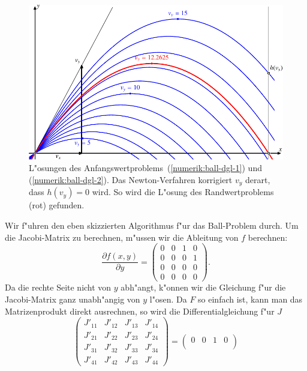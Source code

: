 \begin{beispiel}
\begin{figure}
\centering
\includegraphics{chapters/images/randwert-1.pdf}
\caption{L"osungen des Anfangswertproblems~(\ref{numerik:ball-dgl-1}) und
(\ref{numerik:ball-dgl-2}).
Das Newton-Verfahren korrigiert $v_y$ derart, dass $h(v_y)=0$ wird.
So wird die L"osung des Randwertproblems (rot) gefunden.
\label{numerik:randwert-bild}}
\end{figure}
Wir f"uhren den eben skizzierten Algorithmus f"ur das Ball-Problem durch.
Um die Jacobi-Matrix zu berechnen, m"ussen wir die Ableitung von $f$ berechnen:
\begin{equation}
\frac{\partial f(x,y)}{\partial y}
=
\begin{pmatrix}
0& 0& 1& 0\\
0& 0& 0& 1\\
0& 0& 0& 0\\
0& 0& 0& 0
\end{pmatrix}.
\end{equation}
Da die rechte Seite nicht von $y$ abh"angt, k"onnen wir die Gleichung f"ur
die Jacobi-Matrix ganz unabh"angig von $y$ l"osen.
Da $F$ so einfach ist, kann man das Matrizenprodukt direkt ausrechnen, 
so wird die Differentialgleichung f"ur $J$
\begin{equation}
\begin{pmatrix}
J'_{11}&J'_{12}&J'_{13}&J'_{14}\\
J'_{21}&J'_{22}&J'_{23}&J'_{24}\\
J'_{31}&J'_{32}&J'_{33}&J'_{34}\\
J'_{41}&J'_{42}&J'_{43}&J'_{44}
\end{pmatrix}
=
\begin{pmatrix}
0& 0& 1& 0\\

\end{pmatrix}
\end{equation}
\end{beispiel}
